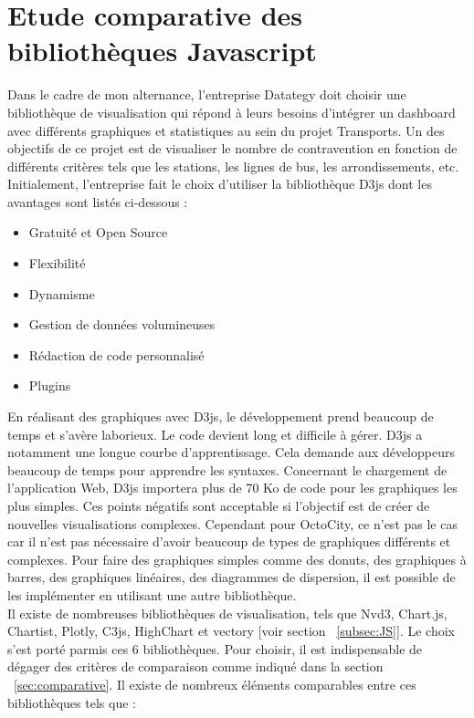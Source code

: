 \documentclass[french, a4paper, 12pt]{report}
\begin{document}
\section{Etude comparative des bibliothèques Javascript}
Dans le cadre de mon alternance, l’entreprise Datategy doit choisir une bibliothèque de visualisation qui répond à leurs besoins d’intégrer un dashboard avec différents graphiques et statistiques au sein du projet Transports. Un des objectifs de ce projet est de visualiser le nombre de contravention en fonction de différents critères tels que les stations, les lignes de bus, les arrondissements, etc. 
Initialement, l’entreprise fait le choix d’utiliser la bibliothèque D3js dont les avantages sont listés ci-dessous :
\begin{itemize}
  \item Gratuité et Open Source
  \item Flexibilité
  \item Dynamisme
  \item Gestion de données volumineuses
  \item Rédaction de code personnalisé
  \item Plugins
\end{itemize}

En réalisant des graphiques avec D3js, le développement prend beaucoup de temps et s’avère laborieux. Le code devient long et difficile à gérer.  D3js a notamment une longue courbe d'apprentissage. Cela demande aux développeurs beaucoup de temps pour apprendre les syntaxes. 
Concernant le chargement de l’application Web, D3js importera plus de 70 Ko de code pour les graphiques les plus simples. 
Ces points négatifs sont acceptable si l'objectif est de créer de nouvelles visualisations complexes. Cependant pour OctoCity, ce n'est pas le cas car il n’est pas nécessaire d’avoir beaucoup de types de graphiques différents et complexes. Pour faire des graphiques simples comme des donuts, des graphiques à barres, des graphiques linéaires, des diagrammes de dispersion, il est possible de les implémenter en utilisant une autre bibliothèque. \\

Il existe de nombreuses bibliothèques de visualisation, tels que Nvd3, Chart.js, Chartist, Plotly, C3js, HighChart et vectory [voir section ~\ref{subsec:JS}]. Le choix s’est porté parmis ces 6 bibliothèques. Pour choisir, il est indispensable de dégager des critères de comparaison comme indiqué dans la section ~\ref{sec:comparative}.
Il existe de nombreux éléments comparables entre ces bibliothèques tels que :
\end{document}
